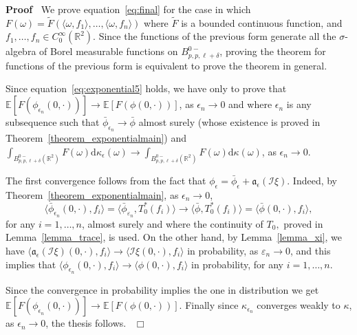 \documentclass[a4paper,10pt]{article}
\newcommand{\asterisk}{\mathord{*}}
\newcommand{\mathd}{\mathrm{d}}
\newenvironment{proof}{\noindent\textbf{Proof\ }}{\hspace*{\fill}$\Box$\medskip}
\begin{document}
\begin{proof}
  We prove equation~{\eqref{eq:final}} for the case in which $F (\omega) =
  \tilde{F} (\langle \omega, f_1 \rangle, \ldots, \langle \omega, f_n
  \rangle)$ where $\tilde{F}$ is a bounded continuous function, and $f_1,
  \ldots, f_n \in C^{\infty}_0 (\mathbb{R}^2)$. Since the functions of the
  previous form generate all the $\sigma$-algebra of Borel measurable
  functions on $B^{0 -}_{p, p, \ell + \delta}$, proving the theorem for
  functions of the previous form is equivalent to prove the theorem in
  general.
  
  Since equation~{\eqref{eq:exponential5}} holds, we have only to prove that
  $\mathbb{E} [F (\phi_{\epsilon_n} (0, \cdot))] \rightarrow \mathbb{E} [F
  (\phi (0, \cdot))]$, as $\epsilon_n \rightarrow 0$ and where $\epsilon_n$ is
  any subsequence such that $\bar{\phi}_{\epsilon_n} \rightarrow \bar{\phi}$
  almost surely (whose existence is proved in
  Theorem~\ref{theorem_exponentialmain}) and $\int_{B^{0 -}_{p, p, \ell +
  \delta} (\mathbb{R}^2)} F (\omega) \mathd \kappa_{\epsilon} (\omega)
  \rightarrow \int_{B^{0 -}_{p, p, \ell + \delta} (\mathbb{R}^2)} F (\omega)
  \mathd \kappa (\omega)$, as $\epsilon_n \rightarrow 0$.
  
  The first convergence follows from the fact that $\phi_{\epsilon} =
  \bar{\phi}_{\epsilon} + \mathcal{\mathfrak{a_{\epsilon} (\mathcal{I}
  \xi)}}$. Indeed, by Theorem~\ref{theorem_exponentialmain}, as $\epsilon_n
  \rightarrow 0$,
  \[ \langle \bar{\phi}_{\epsilon_n} (0, \cdot), f_i \rangle = \langle
     \bar{\phi}_{\varepsilon_n}, T^{\asterisk}_0 (f_i) \rangle \rightarrow
     \langle \bar{\phi}, T^{\asterisk}_0 (f_i) \rangle = \langle \bar{\phi}
     (0, \cdot), f_i \rangle, \]
  for any $i = 1, \ldots, n$, almost surely and where the continuity of $T_0,$
  proved in Lemma~\ref{lemma_trace}, is used. On the other hand, by
  Lemma~\ref{lemma_xi}, we have $\langle \mathfrak{a}_{\epsilon} (\mathcal{I}
  \xi) (0, \cdot), f_i \rangle \rightarrow \langle \mathfrak{} \mathcal{I} \xi
  (0, \cdot), f_i \rangle$ in probability, as $\varepsilon_n \rightarrow 0$,
  and this implies that $\langle \phi_{\epsilon_n} (0, \cdot), f_i \rangle
  \rightarrow \langle \phi (0, \cdot), f_i \rangle$ in probability, for any $i
  = 1, \ldots, n$.
  
  Since the convergence in probability implies the one in distribution we get
  $\mathbb{E} [F (\phi_{\epsilon_n} (0, \cdot))] \rightarrow \mathbb{E} [F
  (\phi (0, \cdot))]$. Finally since $\kappa_{\epsilon_n}$ converges weakly to
  $\kappa$, as $\epsilon_n \rightarrow 0$, the thesis follows. \ 
\end{proof}
\end{document}
